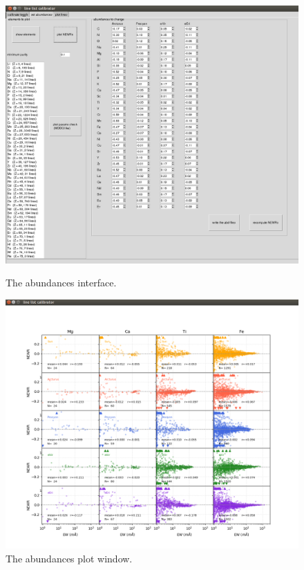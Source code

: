 \documentclass[a4paper,10pt]{article}
\begin{document}
\begin{figure}[h]
\begin{minipage}[t]{14cm}
\centering
\includegraphics[width=12cm]{pics/calibrate_abundances.png}
\caption{The abundances interface.}
\label{calibrate_abundances}

\end{minipage}
\vskip 1cm
\begin{minipage}[t]{14cm}

\centering
\includegraphics[width=12cm]{pics/plot_abundances.png}
\caption{The abundances plot window.}
\label{plot_abundances}
\end{minipage}
\end{figure}
\end{document}
